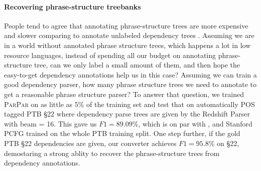 \documentclass[11pt,letterpaper]{article}
\newcommand{\ParseName}{\textsc{ParPar}\xspace}
\begin{document}
\paragraph{Recovering phrase-structure treebanks}
People tend to agree that annotating phrase-structure trees are more expensive and slower comparing to annotate unlabeled dependency trees \cite{schneider2013framework}. Assuming we are in a world without annotated phrase structure trees, which happens a lot in low resource languages, instead of spending all our budget on annotating phrase-structure tree, can we only label a small amount of them, and then hope the easy-to-get dependency annotations help us in this case? Assuming we can train a good dependency parser, how many phrase structure trees we need to annotate to get a reasonable phrase structure parser?
To answer that question, we trained \ParseName on as little as 5\% of the training set and test that on automatically POS tagged PTB \S 22 where dependency parse trees are given by the Redshift Parser with beam = 16. This gave us $F1 = 89.09\%$, which is on par with , and Stanford PCFG \cite{klein2003accurate} trained on the whole PTB training split. One step further, if the gold PTB \S 22 dependencies are given, our converter achieves $F1 = 95.8\%$ on \S 22, demostaring a strong ablity to recover the phrase-structure trees from dependency annotations.




\end{document}
